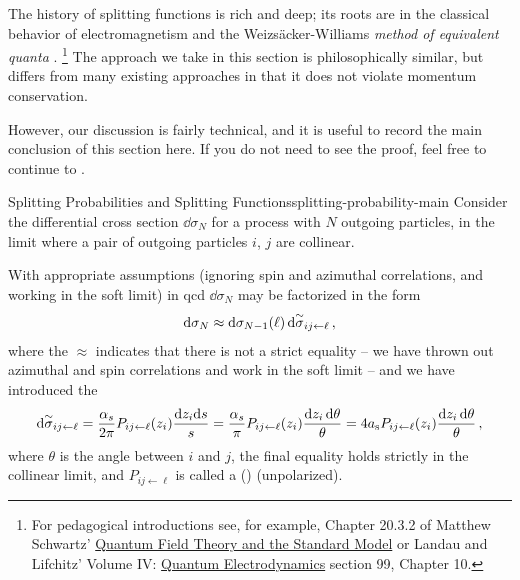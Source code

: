 The history of splitting functions is rich and deep;
%
its roots are in the classical behavior of electromagnetism and the Weizs\"acker-Williams \textit{method of equivalent quanta} \cite{vonWeizsacker:1934nji,Williams:1935dka}.%
\footnote{
    For pedagogical introductions see, for example, Chapter 20.3.2 of Matthew Schwartz' \underline{Quantum Field Theory and the Standard Model} \cite{Schwartz:2014sze} or Landau and Lifchitz' Volume IV: \underline{Quantum Electrodynamics} \cite{Berestetskii:1982qgu} section 99, Chapter 10.
}
%
The approach we take in this section is philosophically similar, but differs from many existing approaches in that it does not violate momentum conservation.


However, our discussion is fairly technical, and it is useful to record the main conclusion of this section here.
%
If you do not need to see the proof, feel free to continue to .

\begin{proposition}{Splitting Probabilities and Splitting Functions}{splitting-probability-main}
    Consider the differential cross section \(\dd\sigma_N\) for a process with \(N\) outgoing particles, in the limit where a pair of outgoing particles \(i\), \(j\) are collinear.

    With appropriate assumptions (ignoring spin and azimuthal correlations, and working in the soft limit) in \gls{qcd} \(\dd\sigma_N\) may be factorized in the form
    \begin{align}
        \dd \sigma_N
        \approx
        \dd\sigma_{N-1}(\ell)
        \,
        \dd\overset{\sim}{\sigma}_{ij \leftarrow \ell}
        \,,
    \end{align}
    where the \(\approx\) indicates that there is not a strict equality -- we have thrown out azimuthal and spin correlations and work in the soft limit -- and we have introduced the 
    \begin{align}
        \label{eq:dsigmatilde_definition}
        \dsigmatilde_{ij \leftarrow \ell}
        =
        \frac{\alpha_s}{2\pi}
        P_{ij \leftarrow \ell}(z_i) \frac{\dd z_i \dd s}{s}
        =
        \frac{\alpha_s}{\pi}
        P_{ij \leftarrow \ell}(z_i) \frac{\dd z_i \, \dd \theta}{\theta}
        =
        4\as
        P_{ij \leftarrow \ell}(z_i) \frac{\dd z_i \, \dd \theta}{\theta}
        \,,
    \end{align}
    where \(\theta\) is the angle between \(i\) and \(j\), the final equality holds strictly in the collinear limit, and \(P_{ij \leftarrow \ell}\) is called a ()  (unpolarized).
\end{proposition}

